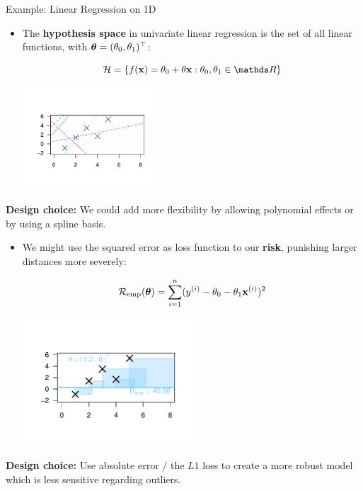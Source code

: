 \documentclass[11pt,compress,t,notes=noshow, xcolor=table]{beamer}
\begin{document}
\begin{vbframe}{Example: Linear Regression on 1D}


\begin{itemize}

  \item The \textbf{hypothesis space} in univariate linear regression is the set
  of all linear functions, with $\bm{\theta} = (\theta_0, \theta_1)^\top$:

  $$\Hspace = \{\fx = \theta_0 + \theta \xv: \theta_0, \theta_1 \in \R \}$$

  \begin{center}
    \includegraphics[trim = 1.5cm 1.5cm 1.5cm 1.5cm, width = 0.4\textwidth]{figure/lm_reg3}
  \end{center}
\end{itemize}
  \textbf{Design choice:} We could add more flexibility by allowing polynomial effects or by using a spline basis.

  \framebreak
\begin{itemize}
  \item We might use the squared error as loss function to our
  \textbf{risk}, punishing larger distances %
  more severely:

  $$\mathcal{R}_{\text{emp}}(\bm{\theta}) = \sum\limits_{i=1}^n (y^{(i)} - \theta_0 - \theta_1 \mathbf{x}^{(i)})^2$$

  \begin{center}
    \includegraphics[trim = 1.5cm 1.5cm 1.5cm 1.5cm, width = 0.5\textwidth]{figure/lm_reg1}
  \end{center}
\end{itemize}
  \textbf{Design choice:} Use absolute error / the $L1$ loss to create a more robust model which is less sensitive regarding outliers.


\end{vbframe}
\end{document}
